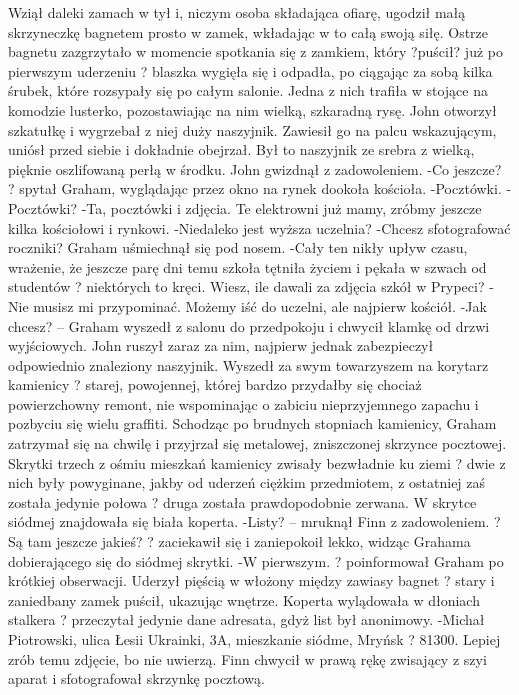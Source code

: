 \documentclass[../MAIN.tex]{subfiles}
\begin{document}
Wziął daleki zamach w tył i, niczym osoba składająca ofiarę, ugodził małą skrzyneczkę bagnetem prosto w zamek, wkładając w to całą swoją siłę.
Ostrze bagnetu zazgrzytało w momencie spotkania się z zamkiem, który ?puścił? już po pierwszym uderzeniu ? blaszka wygięła się i odpadła, po ciągając za sobą kilka śrubek, które rozsypały się po całym salonie. Jedna z nich trafiła w stojące na komodzie lusterko, pozostawiając na nim wielką, szkaradną rysę.
John otworzył szkatułkę i wygrzebał z niej duży naszyjnik.
Zawiesił go na palcu wskazującym, uniósł przed siebie i dokładnie obejrzał. Był to naszyjnik ze srebra z wielką, pięknie oszlifowaną perłą w środku. John gwizdnął z zadowoleniem.
-Co jeszcze? ? spytał Graham, wyglądając przez okno na rynek dookoła kościoła.
-Pocztówki.
-Pocztówki?
-Ta, pocztówki i zdjęcia. Te elektrowni już mamy, zróbmy jeszcze kilka kościołowi i rynkowi.
-Niedaleko jest wyższa uczelnia?
-Chcesz sfotografować roczniki?
Graham uśmiechnął się pod nosem.
-Cały ten nikły upływ czasu, wrażenie, że jeszcze parę dni temu szkoła tętniła życiem i pękała w szwach od studentów ? niektórych to kręci. Wiesz, ile dawali za zdjęcia szkół w Prypeci?
-Nie musisz mi przypominać. Możemy iść do uczelni, ale najpierw kościół.
-Jak chcesz? -- Graham wyszedł z salonu do przedpokoju i chwycił klamkę od drzwi wyjściowych. John ruszył zaraz za nim, najpierw jednak zabezpieczył odpowiednio znaleziony naszyjnik. Wyszedł za swym towarzyszem na korytarz kamienicy ? starej, powojennej, której bardzo przydałby się chociaż powierzchowny remont, nie wspominając o zabiciu nieprzyjemnego zapachu i pozbyciu się wielu graffiti.
Schodząc po brudnych stopniach kamienicy, Graham zatrzymał się na chwilę i przyjrzał się metalowej, zniszczonej skrzynce pocztowej. Skrytki trzech z ośmiu mieszkań kamienicy zwisały bezwładnie ku ziemi ? dwie z nich były powyginane, jakby od uderzeń ciężkim przedmiotem, z ostatniej zaś została jedynie połowa ? druga została prawdopodobnie zerwana.
W skrytce siódmej znajdowała się biała koperta.
-Listy? -- mruknął Finn z zadowoleniem. ? Są tam jeszcze jakieś? ? zaciekawił się i zaniepokoił lekko, widząc Grahama dobierającego się do siódmej skrytki.
-W pierwszym. ? poinformował Graham po krótkiej obserwacji. Uderzył pięścią w włożony między zawiasy bagnet ? stary i zaniedbany zamek puścił, ukazując wnętrze. Koperta wylądowała w dłoniach stalkera ? przeczytał jedynie dane adresata, gdyż list był anonimowy.
-Michał Piotrowski, ulica Łesii Ukrainki, 3A, mieszkanie siódme, Mryńsk ? 81300. Lepiej zrób temu zdjęcie, bo nie uwierzą.
Finn chwycił w prawą rękę zwisający z szyi aparat i sfotografował skrzynkę pocztową.
\end{document}
